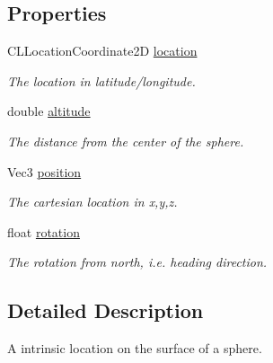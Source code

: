 \subsection*{\-Properties}
\begin{DoxyCompactItemize}
\item 
\hypertarget{interface_a_r_world_location_a433d62d8d53e8c6004b18f0a4ced7420}{
\-C\-L\-Location\-Coordinate2\-D \hyperlink{interface_a_r_world_location_a433d62d8d53e8c6004b18f0a4ced7420}{location}}
\label{interface_a_r_world_location_a433d62d8d53e8c6004b18f0a4ced7420}

\begin{DoxyCompactList}\small\item\em \-The location in latitude/longitude. \end{DoxyCompactList}\item 
\hypertarget{interface_a_r_world_location_a433183faaa54db70be30a6367eab070f}{
double \hyperlink{interface_a_r_world_location_a433183faaa54db70be30a6367eab070f}{altitude}}
\label{interface_a_r_world_location_a433183faaa54db70be30a6367eab070f}

\begin{DoxyCompactList}\small\item\em \-The distance from the center of the sphere. \end{DoxyCompactList}\item 
\hypertarget{interface_a_r_world_location_a51ba96d39c18d08b5fc9df1d30c99bb8}{
\-Vec3 \hyperlink{interface_a_r_world_location_a51ba96d39c18d08b5fc9df1d30c99bb8}{position}}
\label{interface_a_r_world_location_a51ba96d39c18d08b5fc9df1d30c99bb8}

\begin{DoxyCompactList}\small\item\em \-The cartesian location in x,y,z. \end{DoxyCompactList}\item 
\hypertarget{interface_a_r_world_location_a9666c2204abf7340a81f46ab97853a24}{
float \hyperlink{interface_a_r_world_location_a9666c2204abf7340a81f46ab97853a24}{rotation}}
\label{interface_a_r_world_location_a9666c2204abf7340a81f46ab97853a24}

\begin{DoxyCompactList}\small\item\em \-The rotation from north, i.\-e. heading direction. \end{DoxyCompactList}\end{DoxyCompactItemize}


\subsection{\-Detailed \-Description}
\-A intrinsic location on the surface of a sphere. 

